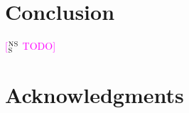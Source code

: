 \documentclass[11pt]{article}
\newcommand{\ensuretext}[1]{#1}
\newcommand{\nssmarker}{\ensuretext{\textcolor{magenta}{\ensuremath{^{\textsc{NS}}_{\textsc{S}}}}}}
\newcommand{\arkcomment}[3]{\ensuretext{\textcolor{#3}{[#1 #2]}}}
\newcommand{\nss}[1]{\arkcomment{\nssmarker}{#1}{magenta}}
\begin{document}

\section{Conclusion}

\nss{TODO}

\section*{Acknowledgments}


{\fontsize{10}{12.25}\selectfont
}
\end{document}
